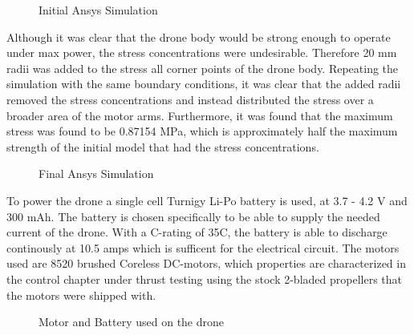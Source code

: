 \begin{figure}[H]%
    \centering
    \caption{Initial Ansys Simulation}%
    \label{fig:example}%
\end{figure}

Although it was clear that the drone body would be strong enough to operate under max power, the stress concentrations were undesirable. Therefore 20 mm radii was added to the stress all corner points of the drone body. Repeating the simulation with the same boundary conditions, it was clear that the added radii removed the stress concentrations and instead distributed the stress over a broader area of the motor arms. Furthermore, it was found that the maximum stress was found to be 0.87154 MPa, which is approximately half the maximum strength of the initial model that had the stress concentrations.

\begin{figure}[H]%
    \centering
    \caption{Final Ansys Simulation}%
    \label{fig:example}%
\end{figure}

To power the drone a single cell Turnigy Li-Po battery is used, at 3.7 - 4.2 V and 300 mAh. The battery is chosen specifically to be able to supply the needed current of the drone. With a C-rating of 35C, the battery is able to discharge continously at 10.5 amps which is sufficent for the electrical circuit. The motors used are 8520 brushed Coreless DC-motors, which properties are characterized in the control chapter under thrust testing using the stock 2-bladed propellers that the motors were shipped with. 

\begin{figure}[H]%
    \centering
    \qquad
    \caption{Motor and Battery used on the drone}%
    \label{fig:example}%
\end{figure}

